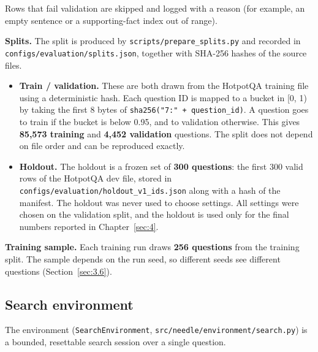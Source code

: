 Rows that fail validation are skipped and logged with a reason (for
example, an empty sentence or a supporting-fact index out of range).

\textbf{Splits.} The split is produced by
\texttt{scripts/\allowbreak{}prepare\_\allowbreak{}splits.\allowbreak{}py}
and recorded in
\texttt{configs/\allowbreak{}evaluation/\allowbreak{}splits.\allowbreak{}json},
together with SHA-256 hashes of the source files.

\begin{itemize}
\tightlist
\item
  \textbf{Train / validation.} These are both drawn from the HotpotQA
  training file using a deterministic hash. Each question ID is mapped
  to a bucket in {[}0, 1) by taking the first 8 bytes of
  \texttt{sha256("7:" + question\_\allowbreak{}id)}. A question goes to
  train if the bucket is below 0.95, and to validation otherwise. This
  gives \textbf{85,573 training} and \textbf{4,452 validation}
  questions. The split does not depend on file order and can be
  reproduced exactly.
\item
  \textbf{Holdout.} The holdout is a frozen set of \textbf{300
  questions}: the first 300 valid rows of the HotpotQA dev file, stored
  in
  \texttt{configs/\allowbreak{}evaluation/\allowbreak{}holdout\_\allowbreak{}v1\_\allowbreak{}ids.\allowbreak{}json}
  along with a hash of the manifest. The holdout was never used to
  choose settings. All settings were chosen on the validation split, and
  the holdout is used only for the final numbers reported in
  Chapter~\ref{sec:4}.
\end{itemize}

\textbf{Training sample.} Each training run draws \textbf{256 questions}
from the training split. The sample depends on the run seed, so
different seeds see different questions (Section~\ref{sec:3.6}).

\subsection{Search environment}\label{sec:3.3}

The environment (\texttt{SearchEnvironment},
\texttt{src/\allowbreak{}needle/\allowbreak{}environment/\allowbreak{}search.\allowbreak{}py})
is a bounded, resettable search session over a single question.

